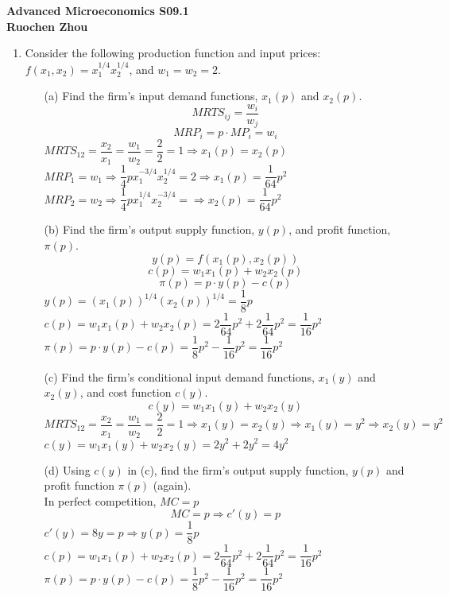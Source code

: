 \documentclass[11pt]{article}
\begin{document}
\begin{center}
\textbf{Advanced Microeconomics S09.1\\}
\textbf{Ruochen Zhou}
\end{center}

\begin{enumerate}
\item Consider the following production function and input prices: $f(x_{1},x_{2})=x_{1}^{1/4}x_{2}^{1/4}$, and $w_{1}=w_{2}=2$.
	\begin{itemize}
	\item[(a)] Find the firm's input demand functions, $x_{1}(p)$ and $x_{2}(p)$.
	\medskip\\
	$$MRTS_{ij}=\dfrac{w_i}{w_j}$$
    $$MRP_i=p\cdot MP_i=w_i$$
    $MRTS_{12}=\dfrac{x_2}{x_1}=\dfrac{w_1}{w_2}=\dfrac{2}{2}=1\Rightarrow x_1(p)=x_2(p)$\\
	$MRP_1=w_1\Rightarrow\dfrac{1}{4}px_1^{-3/4}x_2^{1/4}=2\Rightarrow x_1(p)=\dfrac{1}{64}p^2$\\
	$MRP_2=w_2\Rightarrow\dfrac{1}{4}px_1^{1/4}x_2^{-3/4}=\Rightarrow x_2(p)=\dfrac{1}{64}p^2$\\
	\item[(b)] Find the firm's output supply function, $y(p)$, and profit function, $\pi(p)$.
	\medskip\\
	$$y(p)=f(x_1(p),x_2(p))$$
	$$c(p)=w_1x_1(p)+w_2x_2(p)$$
	$$\pi(p)=p\cdot y(p)-c(p)$$
	$y(p)=(x_1(p))^{1/4}(x_2(p))^{1/4}=\dfrac{1}{8}p$\\
	$c(p)=w_1x_1(p)+w_2x_2(p)=2\dfrac{1}{64}p^2+2\dfrac{1}{64}p^2=\dfrac{1}{16}p^2$\\
	$\pi(p)=p\cdot y(p)-c(p)=\dfrac{1}{8}p^2-\dfrac{1}{16}p^2=\dfrac{1}{16}p^2$
	\item[(c)] Find the firm's conditional input demand functions, $x_{1}(y)$ and $x_{2}(y)$, and cost function $c(y)$.
	\medskip\\
	$$c(y)=w_1x_1(y)+w_2x_2(y)$$
	$MRTS_{12}=\dfrac{x_2}{x_1}=\dfrac{w_1}{w_2}=\dfrac{2}{2}=1\Rightarrow x_1(y)=x_2(y)\Rightarrow x_1(y)=y^2\Rightarrow x_2(y)=y^2$\\
	$c(y)=w_1x_1(y)+w_2x_2(y)=2y^2+2y^2=4y^2$\\
    \item[(d)] Using $c(y)$ in (c), find the firm's output supply function, $y(p)$ and profit function $\pi(p)$ (again).
    \medskip\\
    In perfect competition, $MC=p$
    $$MC=p\Rightarrow c'(y)=p$$
    $c'(y)=8y=p\Rightarrow y(p)=\dfrac{1}{8}p$\\
    $c(p)=w_1x_1(p)+w_2x_2(p)=2\dfrac{1}{64}p^2+2\dfrac{1}{64}p^2=\dfrac{1}{16}p^2$\\
    $\pi(p)=p\cdot y(p)-c(p)=\dfrac{1}{8}p^2-\dfrac{1}{16}p^2=\dfrac{1}{16}p^2$
	\end{itemize}


\end{enumerate}
\end{document}
